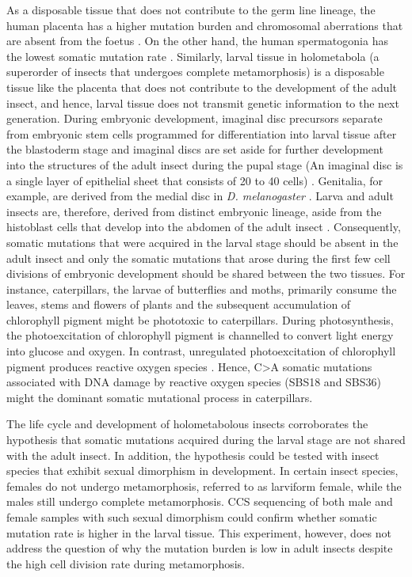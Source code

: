 As a disposable tissue that does not contribute to the germ line lineage, the human placenta has a higher mutation burden and chromosomal aberrations that are absent from the foetus \cite{Coorens2021-ct}. On the other hand, the human spermatogonia has the lowest somatic mutation rate \cite{Rahbari2016-ot}. Similarly, larval tissue in holometabola (a superorder of insects that undergoes complete metamorphosis) is a disposable tissue like the placenta that does not contribute to the development of the adult insect, and hence, larval tissue does not transmit genetic information to the next generation. During embryonic development, imaginal disc precursors separate from embryonic stem cells programmed for differentiation into larval tissue after the blastoderm stage and imaginal discs are set aside for further development into the structures of the adult insect during the pupal stage (An imaginal disc is a single layer of epithelial sheet that consists of 20 to 40 cells) \cite{Wieschaus1976}. Genitalia, for example, are derived from the medial disc in \textit{D. melanogaster} \cite{Bate1993}. Larva and adult insects are, therefore, derived from distinct embryonic lineage, aside from the histoblast cells that develop into the abdomen of the adult insect \cite{Bate1993}. Consequently, somatic mutations that were acquired in the larval stage should be absent in the adult insect and only the somatic mutations that arose during the first few cell divisions of embryonic development should be shared between the two tissues. For instance, caterpillars, the larvae of butterflies and moths, primarily consume the leaves, stems and flowers of plants and the subsequent accumulation of chlorophyll pigment might be phototoxic to caterpillars. During photosynthesis, the photoexcitation of chlorophyll pigment is channelled to convert light energy into glucose and oxygen. In contrast, unregulated photoexcitation of chlorophyll pigment produces reactive oxygen species \cite{Foyer2018-in}. Hence, C>A somatic mutations associated with DNA damage by reactive oxygen species (SBS18 and SBS36) might the dominant somatic mutational process in caterpillars. 

The life cycle and development of holometabolous insects corroborates the hypothesis that somatic mutations acquired during the larval stage are not shared with the adult insect. In addition, the hypothesis could be tested with insect species that exhibit sexual dimorphism in development. In certain insect species, females do not undergo metamorphosis, referred to as larviform female, while the males still undergo complete metamorphosis. CCS sequencing of both male and female samples with such sexual dimorphism could confirm whether somatic mutation rate is higher in the larval tissue. This experiment, however, does not address the question of why the mutation burden is low in adult insects despite the high cell division rate during metamorphosis. 

